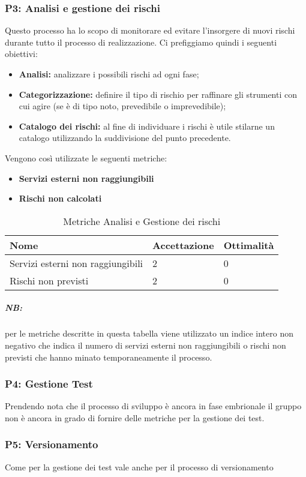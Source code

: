 \subsubsection{P3: Analisi e gestione dei rischi}
Questo processo ha lo scopo di monitorare ed evitare l'insorgere di nuovi rischi durante tutto il processo di realizzazione. Ci prefiggiamo quindi i seguenti obiettivi:
\begin{itemize}
	\item{\textbf{Analisi:} analizzare i possibili rischi ad ogni fase;}
	\item{\textbf{Categorizzazione:}  definire il tipo di rischio per raffinare gli strumenti con cui agire (se è di tipo noto, prevedibile o imprevedibile);}
	\item{\textbf{Catalogo dei rischi:} al fine di individuare i rischi è utile stilarne un catalogo utilizzando la suddivisione del punto precedente.}
\end{itemize}
Vengono così utilizzate le seguenti metriche: 
\begin{itemize}
	\item{\textbf{Servizi esterni non raggiungibili}}
	\item{\textbf{Rischi non calcolati}}
\end{itemize}
\begin{table}[!htbp]
	\centering
	\renewcommand{\arraystretch}{2} 
		\begin{tabular}{|l|l|l|}
			\rowcolor{orange!50}
			\hline
			Nome & Accettazione & Ottimalità \\
			\hline
			Servizi esterni non raggiungibili & 2 & 0 \\
			\hline
			Rischi non previsti & 2 & 0 \\
			\hline
		\end{tabular}
	\caption{Metriche Analisi e Gestione dei rischi}
\end{table}
\subparagraph{\textbf{NB}:} per le metriche descritte in questa tabella viene utilizzato un indice intero non negativo che indica il numero di servizi esterni non raggiungibili o rischi non previsti che hanno minato temporaneamente il processo.
\newpage
\subsubsection{P4: Gestione Test}
Prendendo nota che il processo di sviluppo è ancora in fase embrionale il gruppo non è ancora in grado di fornire delle metriche per la gestione dei test.
\subsubsection{P5: Versionamento}
Come per la gestione dei test vale anche per il processo di versionamento
